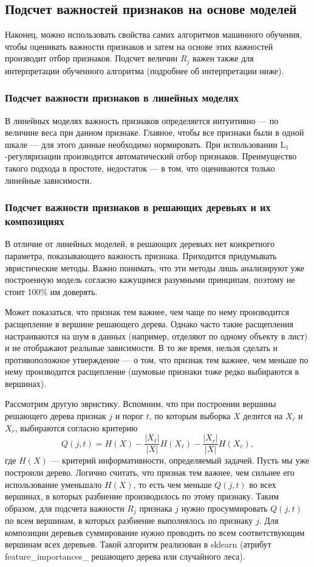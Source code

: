 \documentclass[12pt,a4paper]{article}
\begin{document}
	\subsection{Подсчет важностей признаков на основе моделей}
	Наконец, можно использовать свойства самих алгоритмов машинного обучения, чтобы оценивать важности признаков и затем на основе этих важностей производит отбор признаков. Подсчет величин $R_j$ важен также для интерпретации обученного алгоритма (подробнее об интерпретации ниже).
	
	\subsubsection{Подсчет важности признаков в линейных моделях}
	В линейных моделях важность признаков определяется интуитивно --- по величине веса при данном признаке. Главное, чтобы все признаки были в одной шкале --- для этого данные необходимо нормировать. При использовании L$_1$-регуляризации производится автоматический отбор признаков. Преимущество такого подхода в простоте, недостаток --- в том, что оцениваются только линейные зависимости.
	
	\subsubsection{Подсчет важности признаков в решающих деревьях и их композициях}
	\par В отличие от линейных моделей, в решающих деревьях нет конкретного параметра, показывающего важность признака.   Приходится придумывать эвристические методы. Важно понимать, что эти методы лишь анализируют уже построенную модель согласно кажущимся разумными принципам, поэтому не стоит 100\% им доверять.
	
	\par Может показаться, что  признак тем важнее, чем чаще по нему производится расщепление в вершине решающего дерева.  Однако часто такие расщепления настраиваются на шум в данных (например, отделяют по одному объекту в лист) и не отображают реальные зависимости. В то же время, нельзя сделать и противоположное утверждение --- о том, что признак тем важнее, чем меньше по нему производится расщепление (шумовые признаки тоже редко выбираются в вершинах). 

     Рассмотрим другую эвристику. Вспомним, что при построении вершины решающего дерева признак $j$ и порог $t$, по которым выборка $X$ делится на $X_\ell$ и $X_r$, выбираются согласно критерию
     \[
     Q(j, t) = H(X) - \frac{|X_\ell|}{|X|} H(X_\ell) -  \frac{|X_r|}{|X|} H(X_r),
     \]
     где $H(X)$ --- критерий информативности, определяемый задачей. Пусть мы уже построили дерево. Логично считать, что признак тем важнее, чем сильнее его использование уменьшало $H(X)$, то есть чем меньше $Q(j, t)$ во всех вершинах, в которых разбиение производилось по этому признаку.  Таким образом,  для подсчета важности $R_j$ признака $j$ нужно просуммировать $Q(j, t)$ по всем вершинам, в которых разбиение выполнялось по признаку $j$. Для композиции деревьев суммирование нужно проводить по всем соответствующим вершинам всех деревьев. Такой алгоритм реализован в sklearn (атрибут feature\_importances\_ решающего дерева или случайного леса).
     
\end{document}
